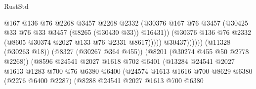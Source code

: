 \begin{lexlean}{RustStd}
\begin{coremodule}
                                              @167
                                              @136
                                              @76
                                              @2268
                                              @3457
                                              @2268
                                              @2332
                                              (@30376
                                                @167
                                                @76
                                                @3457
                                                (@30425
                                                  @33
                                                  @76
                                                  @33
                                                  @3457
                                                  (@8265 (@30430 @33))
                                                  @16431))
                                              (@30376
                                                @136
                                                @76
                                                @2332
                                                (@8605 @30374 @2027 @133 @76 @2331 @8617)))))
                                        @30437))))))
                            (@11328 (@30263 @18))
                            (@8327 (@30267 @364 @455))
                            (@8201 (@30274 @455 @50 @2778 @2268))
                            (@8596
                              @24541
                              @2027
                              @1618
                              @702
                              @6401
                              (@13284
                                @24541
                                @2027
                                @1613
                                @1283
                                @700
                                @76
                                @6380
                                @6400
                                (@24574
                                  @1613
                                  @1616
                                  @700
                                  @8629
                                  @6380
                                  (@2276 @6400 @2287)
                                  (@8288
                                    @24541
                                    @2027
                                    @1613
                                    @700
                                    @6380

\end{coremodule}
\end{lexlean}
